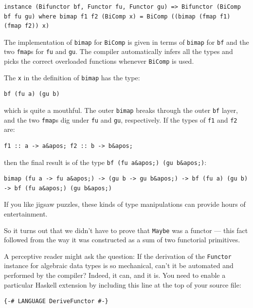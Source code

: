 \begin{verbatim}
instance (Bifunctor bf, Functor fu, Functor gu) => Bifunctor (BiComp bf fu gu) where bimap f1 f2 (BiComp x) = BiComp ((bimap (fmap f1) (fmap f2)) x) 
\end{verbatim}

The implementation of \texttt{bimap} for \texttt{BiComp} is given in
terms of \texttt{bimap} for \texttt{bf} and the two \texttt{fmap}s for
\texttt{fu} and \texttt{gu}. The compiler automatically infers all the
types and picks the correct overloaded functions whenever
\texttt{BiComp} is used.

The \texttt{x} in the definition of \texttt{bimap} has the type:

\begin{verbatim}
bf (fu a) (gu b)
\end{verbatim}

which is quite a mouthful. The outer \texttt{bimap} breaks through the
outer \texttt{bf} layer, and the two \texttt{fmap}s dig under
\texttt{fu} and \texttt{gu}, respectively. If the types of \texttt{f1}
and \texttt{f2} are:

\begin{verbatim}
f1 :: a -> a&apos; f2 :: b -> b&apos;
\end{verbatim}

then the final result is of the type
\texttt{bf\ (fu\ a\&apos;)\ (gu\ b\&apos;)}:

\begin{verbatim}
bimap (fu a -> fu a&apos;) -> (gu b -> gu b&apos;) -> bf (fu a) (gu b) -> bf (fu a&apos;) (gu b&apos;)
\end{verbatim}

If you like jigsaw puzzles, these kinds of type manipulations can
provide hours of entertainment.

So it turns out that we didn't have to prove that \texttt{Maybe} was a
functor --- this fact followed from the way it was constructed as a sum
of two functorial primitives.

A perceptive reader might ask the question: If the derivation of the
\texttt{Functor} instance for algebraic data types is so mechanical,
can't it be automated and performed by the compiler? Indeed, it can, and
it is. You need to enable a particular Haskell extension by including
this line at the top of your source file:

\begin{verbatim}
{-# LANGUAGE DeriveFunctor #-}
\end{verbatim}

